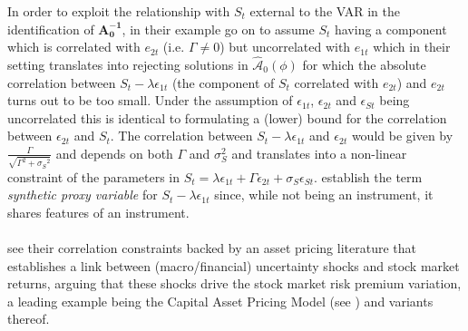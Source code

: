 \documentclass[a4paper,11pt,listof=nochaptergap,oneside,pointednumbers,bibtotoc,bigheadings,liststotoc]{scrbook}
\theoremstyle{mysatz}
\theoremstyle{mydefinition}
\theoremstyle{mytheorem}
\theoremstyle{mybemerkung}
\let\oldhat\hat
\newcommand{\vect}[1]{\boldsymbol{\mathbf{#1}}}
\newcommand{\hatt}[1]{\oldhat{\boldsymbol{\mathbf{#1}}}}
\begin{document}
In order to exploit the relationship with $S_t$ external to the VAR in the identification of $ \vect{A_{0}^{-1}}$, in their example \citet{ludvigsonetal:17} go on to assume $S_t$ having a component which is correlated with $e_{2t}$ (i.e. $\Gamma \neq 0$) but uncorrelated with $e_{1t}$ which in their setting translates into rejecting solutions in $\hatt{\mathcal{A}}_0(\phi)$ for which the absolute correlation between $S_{t} - \lambda \epsilon_{1t}$ (the component of $S_t$ correlated with $e_{2t}$) and $e_{2t}$ turns out to be too small. Under the assumption of  $\epsilon_{1t}$, $\epsilon_{2t}$ and $\epsilon_{St}$ being uncorrelated this is identical to formulating a (lower) bound for the correlation between $\epsilon_{2t}$ and $S_t$. The correlation between $S_{t} - \lambda \epsilon_{1t}$ and $\epsilon_{2t}$ would be given by $\frac{\Gamma}{\sqrt{\Gamma^2 + \sigma_S{^2}}}$ and depends on both $\Gamma$ and $\sigma_S^2$ and translates into a non-linear constraint of the parameters in $S_t = \lambda \epsilon_{1t} + \Gamma \epsilon_{2t} + \sigma_S \epsilon_{St}$. \citet{ludvigsonetal:17} establish the term \textit{synthetic proxy variable} for $S_{t} - \lambda \epsilon_{1t}$ since, while not being an instrument, it shares features of an instrument.
\\
\\
\citet{ludvigsonetal:18} see their correlation constraints backed by an asset pricing literature that establishes a link between (macro/financial) uncertainty shocks and stock market returns, arguing that these shocks drive the stock market risk premium variation, a leading example being the Capital Asset Pricing Model (see \citealp{sharpe:64, lintner:65}) and variants thereof.
\end{document}
